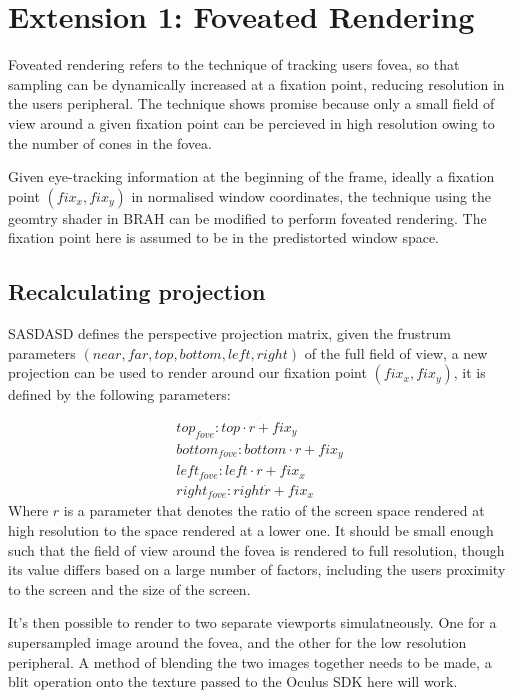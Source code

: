 \documentclass[12pt,a4paper,twoside,openright]{report}
\begin{document}
\section{Extension 1: Foveated Rendering}

Foveated rendering refers to the technique of tracking users fovea, so that sampling can be dynamically increased at a fixation point, reducing resolution in the users peripheral. The technique shows promise because only a small field of view around a given fixation point can be percieved in high resolution owing to the number of cones in the fovea.

Given eye-tracking information at the beginning of the frame, ideally a fixation point $(fix_x,fix_y)$ in normalised window coordinates, the technique using the geomtry shader in BRAH can be modified to perform foveated rendering. The fixation point here is assumed to be in the predistorted window space. 

\subsection{Recalculating projection}

SASDASD defines the perspective projection matrix, given the frustrum parameters $(near, far, top, bottom, left, right)$ of the full field of view, a new projection can be used to render around our fixation point $(fix_x, fix_y)$, it is defined by the following parameters:

\[
\begin{matrix}
top_{fove}: top \cdot r + fix_y \\
bottom_{fove}: bottom \cdot r + fix_y \\
left_{fove}: left \cdot r + fix_x \\
right_{fove}: right \dot r + fix_x 
\end{matrix}
\]
Where $r$ is a parameter that denotes the ratio of the screen space rendered at high resolution to the space rendered at a lower one. It should be small enough such that the field of view around the fovea is rendered to full resolution, though its value differs based on a large number of factors, including the users proximity to the screen and the size of the screen.

It's then possible to render to two separate viewports simulatneously. One for a supersampled image around the fovea, and the other for the low resolution peripheral. A method of blending the two images together needs to be made, a blit operation onto the texture passed to the Oculus SDK here will work. 
\end{document}
